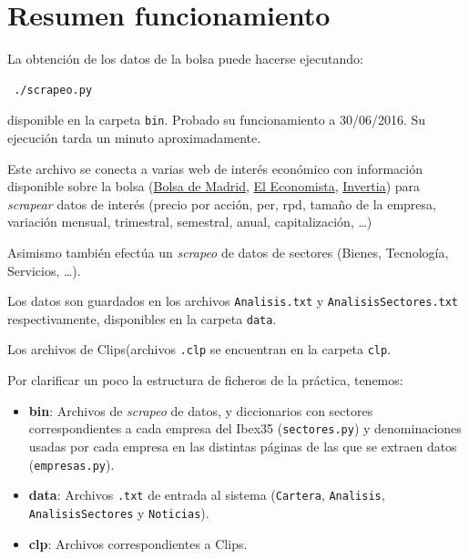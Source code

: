 \documentclass[a4paper,11pt]{article}
\newcommand{\imagent}[4]{
    \begin{figure}
    \begin{center}
    \texttt{[image: \#1]}
    \end{center}
    \caption{#3}
    \label{#4}
  \end{figure}
}
\newcommand{\imagen}[4]{
  \begin{minipage}{\linewidth}
    \centering
    \texttt{[image: \#1]}
    \captionof{figure}{#2}
    \label{#3}
  \end{minipage}
}
\begin{document}
\newpage
\tableofcontents
\newpage

\section{Resumen funcionamiento}
La obtención de los datos de la bolsa puede hacerse ejecutando:

\begin{verbatim}
 ./scrapeo.py
\end{verbatim}

disponible en la carpeta \texttt{bin}. Probado su funcionamiento a 30/06/2016. Su ejecución tarda un minuto aproximadamente.

Este archivo se conecta a varias web de interés económico con información disponible sobre la bolsa 
(\href{http://www.bolsamadrid.es}{Bolsa de Madrid}, \href{http://www.eleconomista.es}{El Economista},
\href{http://www.invertia.com/}{Invertia}) para \textit{scrapear} datos de interés (precio por acción,
per, rpd, tamaño de la empresa, variación mensual, trimestral, semestral, anual, capitalización, \ldots) 

Asimismo también efectúa un \textit{scrapeo} de datos de sectores (Bienes, Tecnología, Servicios, \ldots).

Los datos son guardados en los archivos \texttt{Analisis.txt} y \texttt{AnalisisSectores.txt} respectivamente,
disponibles en la carpeta \texttt{data}.

Los archivos de Clips(archivos \texttt{.clp} se encuentran en la carpeta \texttt{clp}.

Por clarificar un poco la estructura de ficheros de la práctica, tenemos:
\begin{itemize}
 \item \textbf{bin}: Archivos de \textit{scrapeo} de datos, y diccionarios con sectores correspondientes a cada empresa 
 del Ibex35 (\texttt{sectores.py}) y denominaciones usadas por cada empresa en las distintas páginas de las que se
 extraen datos (\texttt{empresas.py}).
 \item \textbf{data}: Archivos \texttt{.txt} de entrada al sistema (\texttt{Cartera}, \texttt{Analisis}, 
 \texttt{AnalisisSectores} y \texttt{Noticias}).
 \item \textbf{clp}: Archivos correspondientes a Clips.
\end{itemize}
\end{document}
